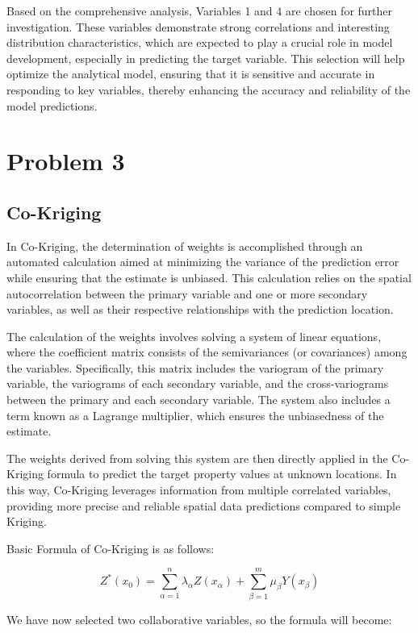 \documentclass{swmcmthesis}
\begin{document}
Based on the comprehensive analysis, Variables 1 and 4 are chosen for further investigation. These variables demonstrate strong correlations and interesting distribution characteristics, which are expected to play a crucial role in model development, especially in predicting the target variable. This selection will help optimize the analytical model, ensuring that it is sensitive and accurate in responding to key variables, thereby enhancing the accuracy and reliability of the model predictions.

\section{Problem 3}
\subsection{Co-Kriging}
In Co-Kriging, the determination of weights is accomplished through an automated calculation aimed at minimizing the variance of the prediction error while ensuring that the estimate is unbiased. This calculation relies on the spatial autocorrelation between the primary variable and one or more secondary variables, as well as their respective relationships with the prediction location.

The calculation of the weights involves solving a system of linear equations, where the coefficient matrix consists of the semivariances (or covariances) among the variables. Specifically, this matrix includes the variogram of the primary variable, the variograms of each secondary variable, and the cross-variograms between the primary and each secondary variable. The system also includes a term known as a Lagrange multiplier, which ensures the unbiasedness of the estimate.

The weights derived from solving this system are then directly applied in the Co-Kriging formula to predict the target property values at unknown locations. In this way, Co-Kriging leverages information from multiple correlated variables, providing more precise and reliable spatial data predictions compared to simple Kriging.

Basic Formula of Co-Kriging is as follows:

\begin{equation}
Z^*(x_0) = \sum_{\alpha=1}^n \lambda_\alpha Z(x_\alpha) + \sum_{\beta=1}^m \mu_{\beta} Y(x_{\beta})   
\end{equation}

We have now selected two collaborative variables, so the formula will become:
\end{document}
